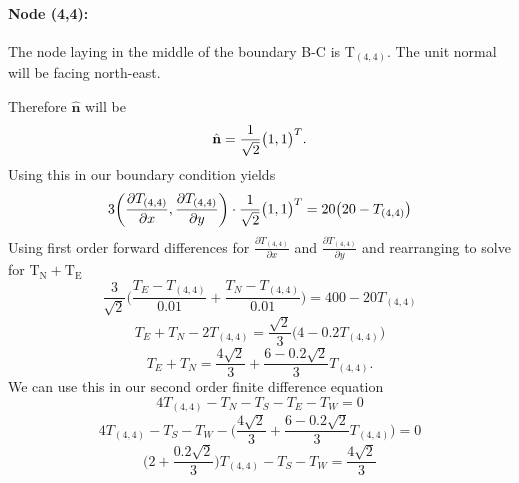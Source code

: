 \documentclass[12pt,a4paper]{article}
\begin{document}
\paragraph*{Node (4,4):} The node laying in the middle of the boundary B-C is T$_{(4,4)}$. The unit normal will be facing north-east.
\begin{center}
\end{center}
Therefore $\hat{{\textbf{n}}}$ will be
\[\hat{\textbf{n}}=\frac{1}{\sqrt{2}}\big{(}1,1\big{)}^T.\]
Using this in our boundary condition yields
\[3\bigg{(}\frac{\partial T_{(4,4)}}{\partial x},\frac{\partial T_{(4,4)}}{\partial y}\bigg{)}\cdot\frac{1}{\sqrt{2}}\big{(}1,1\big{)}^T=20\big{(}20-T_{(4,4)}\big{)}\]
Using first order forward differences for $\frac{\partial T_{(4,4)}}{\partial x}$ and $\frac{\partial T_{(4,4)}}{\partial y}$ and rearranging to solve for $\text{T}_\text{N}+\text{T}_\text{E}$
\[\frac{3}{\sqrt{2}}\bigg(\frac{T_E-T_{(4,4)}}{0.01}+\frac{T_N-T_{(4,4)}}{0.01}\bigg)=400-20T_{(4,4)}\]
\[T_E+T_N-2T_{(4,4)}=\frac{\sqrt{2}}{3}\big(4-0.2T_{(4,4)}\big)\]
\[T_E+T_N=\frac{4\sqrt{2}}{3}+\frac{6-0.2\sqrt{2}}{3}T_{(4,4)}.\]
We can use this in our second order finite difference equation 
\[4T_{(4,4)}-T_N-T_S-T_E-T_W=0\]
\[4T_{(4,4)}-T_S-T_W-\bigg(\frac{4\sqrt{2}}{3}+\frac{6-0.2\sqrt{2}}{3}T_{(4,4)}\bigg)=0\]
\[\bigg(2+\frac{0.2\sqrt{2}}{3}\bigg)T_{(4,4)}-T_S-T_W=\frac{4\sqrt{2}}{3}\]
\end{document}
